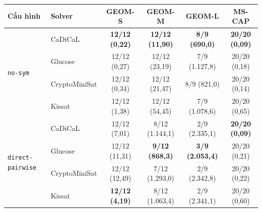 \begin{tabular}{llcccc}
\toprule
Cấu hình & Solver & GEOM-S & GEOM-M & GEOM-L & MS-CAP \\
\midrule
\multirow{4}{*}{\texttt{no-sym}} & CaDiCaL & \textbf{12/12 (0,22)} & \textbf{12/12 (11,90)} & \textbf{8/9 (690,0)} & \textbf{20/20 (0,09)} \\
 & Glucose & 12/12 (0,27) & 12/12 (23,19) & 7/9 (1.127,8) & 20/20 (0,18) \\
 & CryptoMiniSat & 12/12 (0,34) & 12/12 (21,47) & 8/9 (821,0) & 20/20 (0,14) \\
 & Kissat & 12/12 (1,38) & 12/12 (54,45) & 7/9 (1.078,6) & 20/20 (0,65) \\
\midrule
\multirow{4}{*}{\texttt{direct-pairwise}} & CaDiCaL & 12/12 (7,01) & 8/12 (1.144,1) & 2/9 (2.335,1) & \textbf{20/20 (0,09)} \\
 & Glucose & 12/12 (11,31) & \textbf{9/12 (868,3)} & \textbf{3/9 (2.053,4)} & 20/20 (0,21) \\
 & CryptoMiniSat & 12/12 (12,49) & 7/12 (1.293,0) & 2/9 (2.342,8) & 20/20 (0,22) \\
 & Kissat & \textbf{12/12 (4,19)} & 8/12 (1.063,4) & 2/9 (2.341,1) & 20/20 (0,60) \\
\bottomrule
\end{tabular}
